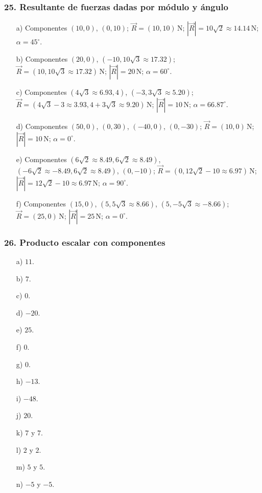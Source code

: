 \subsubsection*{25. Resultante de fuerzas dadas por módulo y ángulo}
\begin{enumerate}
    \item[a)] Componentes $(10,0)$, $(0,10)$;
    $\vec{R}=(10,10)\,\mathrm{N}$;
    $|\vec{R}|=10\sqrt{2}\approx14.14\,\mathrm{N}$;
    $\alpha=45^\circ$.

    \item[b)] Componentes $(20,0)$,
    $(-10,10\sqrt{3}\approx17.32)$;
    $\vec{R}=(10,10\sqrt{3}\approx17.32)\,\mathrm{N}$;
    $|\vec{R}|=20\,\mathrm{N}$;
    $\alpha=60^\circ$.

    \item[c)] Componentes $(4\sqrt{3}\approx6.93,4)$,
    $(-3,3\sqrt{3}\approx5.20)$;
    $\vec{R}=(4\sqrt{3}-3\approx3.93,4+3\sqrt{3}\approx9.20)\,\mathrm{N}$;
    $|\vec{R}|=10\,\mathrm{N}$;
    $\alpha=66.87^\circ$.

    \item[d)] Componentes $(50,0)$, $(0,30)$, $(-40,0)$, $(0,-30)$;
    $\vec{R}=(10,0)\,\mathrm{N}$;
    $|\vec{R}|=10\,\mathrm{N}$;
    $\alpha=0^\circ$.

    \item[e)] Componentes
    $(6\sqrt{2}\approx8.49,6\sqrt{2}\approx8.49)$,
    $(-6\sqrt{2}\approx-8.49,6\sqrt{2}\approx8.49)$,
    $(0,-10)$;
    $\vec{R}=(0,12\sqrt{2}-10\approx6.97)\,\mathrm{N}$;
    $|\vec{R}|=12\sqrt{2}-10\approx6.97\,\mathrm{N}$;
    $\alpha=90^\circ$.

    \item[f)] Componentes $(15,0)$,
    $(5,5\sqrt{3}\approx8.66)$,
    $(5,-5\sqrt{3}\approx-8.66)$;
    $\vec{R}=(25,0)\,\mathrm{N}$;
    $|\vec{R}|=25\,\mathrm{N}$;
    $\alpha=0^\circ$.
\end{enumerate}

\subsubsection*{26. Producto escalar con componentes}
\begin{enumerate}
    \item[a)] $11$.
    \item[b)] $7$.
    \item[c)] $0$.
    \item[d)] $-20$.
    \item[e)] $25$.
    \item[f)] $0$.
    \item[g)] $0$.
    \item[h)] $-13$.
    \item[i)] $-48$.
    \item[j)] $20$.
    \item[k)] $7$ y $7$.
    \item[l)] $2$ y $2$.
    \item[m)] $5$ y $5$.
    \item[n)] $-5$ y $-5$.
\end{enumerate}

